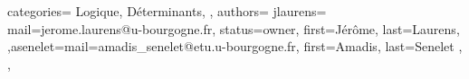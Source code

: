 {
  categories={
    Logique,
    Déterminants,
  },
  authors={
    jlaurens={
      mail=jerome.laurens@u-bourgogne.fr,
      status=owner,
      first=Jérôme,
      last=Laurens,
    },asenelet={mail=amadis_senelet@etu.u-bourgogne.fr, 
      first=Amadis,
      last=Senelet
   },
 }, 
 
}
